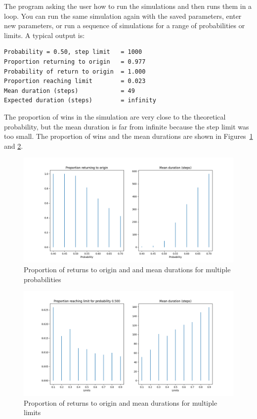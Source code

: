 The program asking the user how to run the simulations and then runs them in a loop. You can run the same simulation again with the saved parameters, enter new parameters, or run a sequence of simulations for a range of probabilities or limits. A typical output is:
\begin{verbatim}
Probability = 0.50, step limit   = 1000
Proportion returning to origin   = 0.977
Probability of return to origin  = 1.000
Proportion reaching limit        = 0.023
Mean duration (steps)            = 49
Expected duration (steps)        = infinity
\end{verbatim}
The proportion of wins in the simulation are very close to the theoretical probability, but the mean duration is far from infinite because the step limit was too small.  The proportion of wins and the mean durations are shown in Figures~\ref{f.random-walk-01} and \ref{f.random-walk-02}.
\begin{figure}
\begin{center}
\includegraphics[width=\textwidth]{random-walk-01}
\caption{Proportion of returns to origin and and mean durations for multiple probabilities}\label{f.random-walk-01}
\end{center}
\end{figure}
\begin{figure}
\begin{center}
\includegraphics[width=\textwidth]{random-walk-02}
\caption{Proportion of returns to origin and mean durations for multiple limits}\label{f.random-walk-02}
\end{center}
\end{figure}

